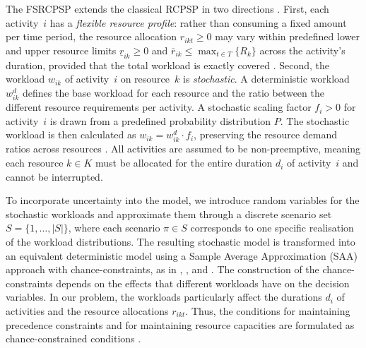 The FSRCPSP extends the classical RCPSP in two directions
\parencite{Mendl2024}. First, each activity~$i$ has a
\emph{flexible resource profile}: rather than consuming a fixed
amount per time period, the resource allocation $r_{ikt} \geq 0$
may vary within predefined lower and upper resource limits
$\underline{r}_{ik} \geq 0$ and
$\overline{r}_{ik} \leq \max_{t \in T}\{R_k\}$ across the
activity's duration, provided that the total workload is exactly
covered \parencite{Naber2014}. Second, the workload $w_{ik}$ of
activity~$i$ on resource~$k$ is \emph{stochastic}. A
deterministic workload $w^d_{ik}$ defines the base workload for
each resource and the ratio between the different resource
requirements per activity. A stochastic scaling factor $f_i > 0$
for activity~$i$ is drawn from a predefined probability
distribution $P$. The stochastic workload is then calculated as
$w_{ik} = w^d_{ik} \cdot f_i$, preserving the resource demand
ratios across resources \parencite{Mendl2024}. All activities are
assumed to be non-preemptive, meaning each resource $k \in K$
must be allocated for the entire duration $d_i$ of activity~$i$
and cannot be interrupted.

To incorporate uncertainty into the model, we introduce random
variables for the stochastic workloads and approximate them
through a discrete scenario set $S = \{1, \ldots, |S|\}$, where
each scenario $\pi \in S$ corresponds to one specific realisation
of the workload distributions. The resulting stochastic model is
transformed into an equivalent deterministic model using a Sample
Average Approximation (SAA) approach with chance-constraints, as
in \textcite{Bruni2011}, \textcite{Lamas2016}, and \textcite{MendlRieck2024}. The
construction of the chance-constraints depends on the effects
that different workloads have on the decision variables. In our
problem, the workloads particularly affect the durations $d_i$ of
activities and the resource allocations $r_{ikt}$. Thus, the
conditions for maintaining precedence constraints and for
maintaining resource capacities are formulated as
chance-constrained conditions \parencite{Sallam2021}.

